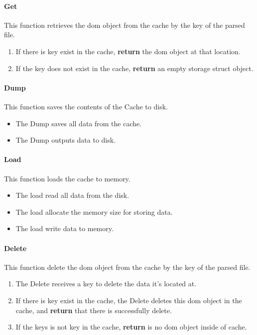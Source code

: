\paragraph{Get} This function retrieves the \gls{dom} object from the cache by the key of the parsed file.

\begin{enumerate}
    \item If there is key exist in the cache, \textbf{return} the \gls{dom} object at that location.
    \item If the key does not exist in the cache, \textbf{return} an empty storage struct object.
\end{enumerate}

\paragraph{Dump} This function saves the contents of the Cache to disk.

\begin{itemize}
    \item The Dump saves all data from the cache.
    \item The Dump outputs data to disk.
\end{itemize}

\paragraph{Load} This function loads the cache to memory.

\begin{itemize}
    \item The load read all data from the disk.
    \item The load allocate the memory size for storing data.
    \item The load write data to memory.
\end{itemize}

\paragraph{Delete} This function delete the \gls{dom} object from the cache by the key of the parsed file.

\begin{enumerate}
    \item The Delete receives a key to delete the data it's located at.
    \item If there is key exist in the cache, the Delete deletes this \gls{dom} object in the cache, and \textbf{return} that there is successfully delete.
    \item If the keys is not key in the cache, \textbf{return} is no \gls{dom} object inside of cache.
\end{enumerate}

